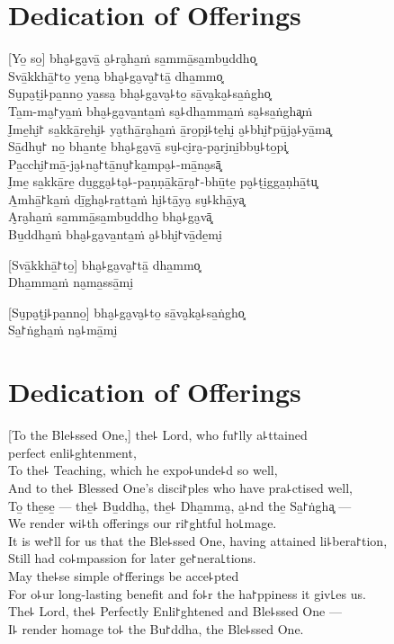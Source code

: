 \chapter*{Dedication of Offerings}

\delegateSetUseNext

[Yo̱ so̱] bha̮꜕ga̮vā̱ a̮꜕ra̮ha̱ṁ sa̱mmā̱sa̱mbu̱ddho͓\\
Svā̱kkhā̱꜓to̱ ye̱na̮ bha̮꜕ga̮va̮꜓tā̱ dha̱mmo͓\\
Su̮pa̮ṭi̮꜕pa̱nno̱ ya̱ssa̮ bha̮꜕ga̮va̮꜕to̱ sā̱va̮ka̮꜕sa̱ṅgho͓\\
Ta̱m-ma̮꜓ya̱ṁ bha̮꜕ga̮va̱nta̱ṁ sa̮꜕dha̱mma̱ṁ sa̮꜕sa̱ṅgha͓ṁ\\
I̮me̱hi̮꜓ sa̱kkā̱re̱hi̮꜕ ya̮thā̱ra̮ha̱ṁ ā̱ro̱pi̮꜕te̱hi̮ a̮꜕bhi̮꜓pū̱ja̮꜕yā̱ma͓\\
Sā̱dhu̮꜓ no̱ bha̱nte̱ bha̮꜕ga̮vā̱ su̮꜕ci̮ra̮-pa̮ri̮ni̱bbu̮꜕to̱pi͓\\
Pa̱cchi̮꜓mā̱-ja̮꜕na̮꜓tā̱nu̮꜓ka̱mpa̮꜕-mā̱na̮sā͓\\
I̮me̱ sa̱kkā̱re̱ du̱gga̮꜕ta̮꜕-pa̱ṇṇā̱kā̱ra̮꜓-bhū̱te̱ pa̮꜕ṭi̱gga̱ṇhā̱tu͓\\
A̱mhā̱꜓ka̱ṁ dī̱gha̮꜕ra̱tta̱ṁ hi̮꜕tā̱ya̮ su̮꜕khā̱ya͓\\
A̮ra̮ha̱ṁ sa̱mmā̱sa̱mbu̱ddho̱ bha̮꜕ga̮vā͓\\
Bu̱ddha̱ṁ bha̮꜕ga̮va̱nta̱ṁ a̮꜕bhi̮꜓vā̱de̱mi̮ 

[Svā̱kkhā̱꜓to̱] bha̮꜕ga̮va̮꜓tā̱ dha̱mmo͓\\
Dha̱mma̱ṁ na̮ma̱ssā̱mi̮ 

[Su̮pa̮ṭi̮꜕pa̱nno̱] bha̮꜕ga̮va̮꜕to̱ sā̱va̮ka̮꜕sa̱ṅgho͓\\
Sa̱꜓ṅgha̱ṁ na̮꜕mā̱mi̮ 

\clearpage

\chapter{Dedication of Offerings}

[To the Ble꜕ssed One,] the꜕ Lord, who fu꜓lly a꜕ttained\\
\vin perfect enli꜕ghtenment,\\
To the꜕ Teaching, which he expo꜕unde꜕d so well,\\
And to the꜕ Blessed One's disci꜓ples who have pra꜕ctised well,\\
To̱ the̱se̱ --- the̱꜕ Bu̱ddha̮, the̱꜕ Dha̱mma̮, a̱꜕nd the̱ Sa̱꜓ṅgha͓ ---\\
We render wi꜕th offerings our ri꜓ghtful ho꜖mage.\\
It is we꜓ll for us that the Ble꜕ssed One, having attained li꜕bera꜓tion,\\
Still had co꜕mpassion for later ge꜓nera꜖tions.\\
May the꜕se simple o꜓fferings be acce꜕pted\\
For o꜕ur long-lasting benefit and fo꜕r the ha꜓ppiness it giv꜖es us.\\
The꜕ Lord, the꜕ Perfectly Enli꜓ghtened and Ble꜕ssed One ---\\
I꜕ render homage to꜕ the Bu꜓ddha, the Ble꜕ssed One. 

